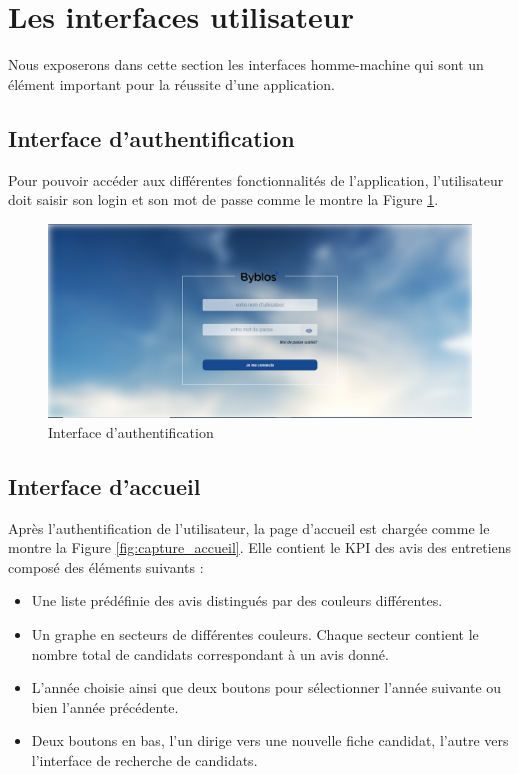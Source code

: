 \section{Les interfaces utilisateur}
Nous exposerons dans cette section les interfaces homme-machine qui sont un élément important pour la réussite d'une application.
\subsection{Interface d'authentification}
Pour pouvoir accéder aux différentes fonctionnalités de l’application, l'utilisateur doit saisir son login et son mot de passe comme le montre la Figure \ref{fig:capture_auth}.
\begin{figure}[H]
     \centering
     \includegraphics[scale=0.5]{img/capture authentification.PNG}
     \caption{Interface d'authentification}
     \label{fig:capture_auth}
 \end{figure}
\subsection{Interface d'accueil}
Après l'authentification de l'utilisateur, la page d'accueil est chargée comme le montre la Figure \ref{fig:capture_accueil}. Elle contient le KPI des avis des entretiens composé des éléments suivants :
\begin{itemize}
    \item Une liste prédéfinie des avis distingués par des couleurs différentes.
    \item Un graphe en secteurs de différentes couleurs. Chaque secteur contient le nombre total de candidats correspondant à un avis donné.
    \item L'année choisie ainsi que deux boutons pour sélectionner l'année suivante ou bien l'année précédente.
    \item Deux boutons en bas, l'un dirige vers une nouvelle fiche candidat, l'autre vers l'interface de recherche de candidats.  
    
\end{itemize}
 

